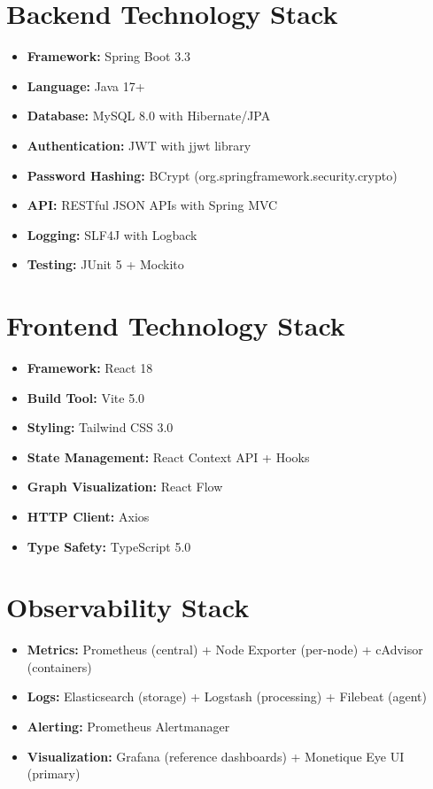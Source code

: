 \documentclass[12pt,a4paper]{report}
\begin{document}
\section{Backend Technology Stack}

\begin{itemize}
  \item \textbf{Framework:} Spring Boot 3.3
  \item \textbf{Language:} Java 17+
  \item \textbf{Database:} MySQL 8.0 with Hibernate/JPA
  \item \textbf{Authentication:} JWT with jjwt library
  \item \textbf{Password Hashing:} BCrypt (org.springframework.security.crypto)
  \item \textbf{API:} RESTful JSON APIs with Spring MVC
  \item \textbf{Logging:} SLF4J with Logback
  \item \textbf{Testing:} JUnit 5 + Mockito
\end{itemize}

\section{Frontend Technology Stack}

\begin{itemize}
  \item \textbf{Framework:} React 18
  \item \textbf{Build Tool:} Vite 5.0
  \item \textbf{Styling:} Tailwind CSS 3.0
  \item \textbf{State Management:} React Context API + Hooks
  \item \textbf{Graph Visualization:} React Flow
  \item \textbf{HTTP Client:} Axios
  \item \textbf{Type Safety:} TypeScript 5.0
\end{itemize}

\section{Observability Stack}

\begin{itemize}
  \item \textbf{Metrics:} Prometheus (central) + Node Exporter (per-node) + cAdvisor (containers)
  \item \textbf{Logs:} Elasticsearch (storage) + Logstash (processing) + Filebeat (agent)
  \item \textbf{Alerting:} Prometheus Alertmanager
  \item \textbf{Visualization:} Grafana (reference dashboards) + Monetique Eye UI (primary)
\end{itemize}
\end{document}
